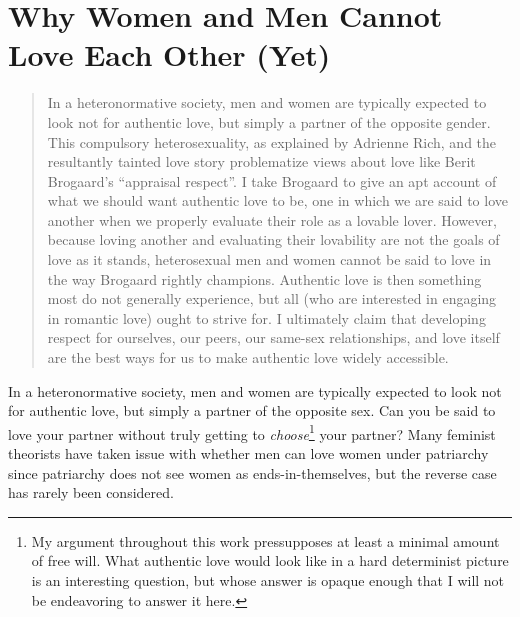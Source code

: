 
\chapter{Why Women and Men Cannot Love Each Other (Yet)}

\renewcommand{\thesection}{\Roman{section}}

\renewcommand{\thesubsection}{\alph{subsection}.}

\begin{quote}
In a heteronormative society, men and women are
typically expected to look not for authentic love, but simply a partner
of the opposite gender. This compulsory heterosexuality, as explained by
Adrienne Rich, and the resultantly tainted love story problematize views
about love like Berit Brogaard's ``appraisal respect''. I take Brogaard
to give an apt account of what we should want authentic love to be, one
in which we are said to love another when we properly evaluate their
role as a lovable lover. However, because loving another and evaluating
their lovability are not the goals of love as it stands, heterosexual
men and women cannot be said to love in the way Brogaard rightly
champions. Authentic love is then something most do not generally
experience, but all (who are interested in engaging in romantic love)
ought to strive for. I ultimately claim that developing respect for
ourselves, our peers, our same-sex relationships, and love itself are
the best ways for us to make authentic love widely accessible.
\end{quote}

\vspace{\credgap}

\noindent In a heteronormative society, men and women are
typically expected to look not for authentic love, but simply a partner
of the opposite sex. Can you be said to love your partner without truly
getting to \emph{choose}\footnote{My argument throughout this work pressupposes at least a minimal amount of free will. What authentic love would look like in a hard determinist picture is an interesting question, but whose answer is opaque enough that I will not be endeavoring to answer it here.} your partner? Many feminist theorists
have taken issue with whether men can love women under patriarchy since
patriarchy does not see women as ends-in-themselves, but the reverse
case has rarely been considered.

